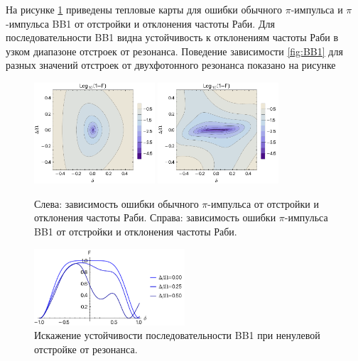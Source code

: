 На рисунке \ref{fig:BB1_offset_contor} приведены тепловые карты для ошибки обычного $\pi$-импульса и $\pi$-импульса BB1 от отстройки и отклонения частоты Раби. Для последовательности BB1 видна устойчивость к отклонениям частоты Раби в узком диапазоне отстроек от резонанса. Поведение зависимости \ref{fig:BB1} для разных значений отстроек от двухфотонного резонанса показано на рисунке  

\begin{figure}[H]
	\centering
	\includegraphics[width=0.4\textwidth]{images/pulse_offset_contor.pdf}
	\hspace{1em}
	\includegraphics[width=0.4\textwidth]{images/BB1_offset_contor.pdf}
	\caption{Слева: зависимость ошибки обычного $\pi$-импульса от отстройки и отклонения частоты Раби. Справа: зависимость ошибки $\pi$-импульса BB1 от отстройки и отклонения частоты Раби.}
	\label{fig:BB1_offset_contor}
\end{figure}


\begin{figure}[H]
	\centering
	\includegraphics[width=0.5\textwidth]{images/BB1_offset.pdf}
	\caption{Искажение устойчивости последовательности BB1 при ненулевой отстройке от резонанса.}
	\label{fig:BB1_offset}
\end{figure}


